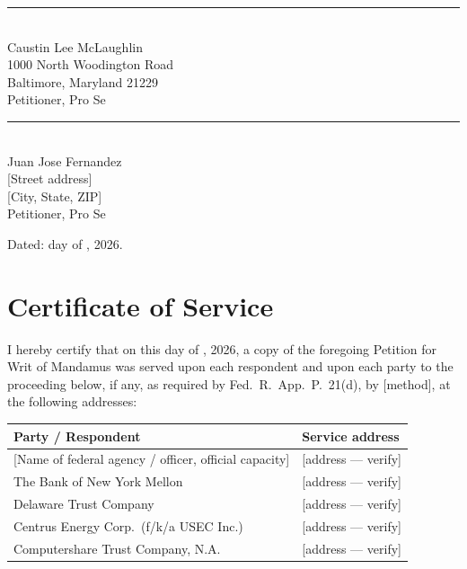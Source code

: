 \documentclass[14pt,letterpaper]{extarticle}
\begin{document}
\vspace{0.4in}
\noindent\rule{3.0in}{0.4pt}\\
Caustin Lee McLaughlin\\
1000 North Woodington Road\\
Baltimore, Maryland 21229\\
Petitioner, Pro Se

\vspace{0.4in}
\noindent\rule{3.0in}{0.4pt}\\
Juan Jose Fernandez\\
{[Street address]}\\
{[City, State, ZIP]}\\
Petitioner, Pro Se

\vspace{0.25in}
\noindent Dated: \underline{\hspace{0.4in}} day of
\underline{\hspace{1.4in}}, 2026.

\newpage
\section{Certificate of Service}

I hereby certify that on this \underline{\hspace{0.4in}} day of
\underline{\hspace{1.4in}}, 2026, a copy of the foregoing Petition for Writ of
Mandamus was served upon each respondent and upon each party to the proceeding
below, if any, as required by Fed.\ R.\ App.\ P.\ 21(d), by [method], at the
following addresses:

\vspace{0.2in}
\noindent
\begin{tabularx}{\textwidth}{@{}p{2.6in}X@{}}
\toprule
Party / Respondent & Service address\\
\midrule
{[Name of federal agency / officer, official capacity]} & [address --- verify]\\
The Bank of New York Mellon & [address --- verify]\\
Delaware Trust Company & [address --- verify]\\
Centrus Energy Corp.\ (f/k/a USEC Inc.) & [address --- verify]\\
Computershare Trust Company, N.A. & [address --- verify]\\
\bottomrule
\end{tabularx}
\end{document}
